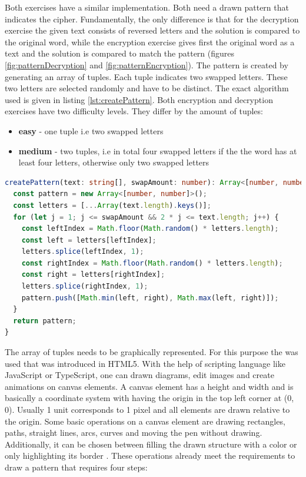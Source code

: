 Both exercises have a similar implementation. Both need a drawn pattern that indicates the cipher. Fundamentally, the only difference is that for the decryption exercise the given text consists of reversed letters and the solution is compared to the original word, while the encryption exercise gives first the original word as a text and the solution is compared to match the pattern (figures \ref{fig:patternDecryption} and \ref{fig:patternEncryption}). 
The pattern is created by generating an array of tuples. Each tuple indicates two swapped letters. These two letters are selected randomly and have to be distinct. The exact algorithm used is given in listing \ref{lst:createPattern}.
Both encryption and decryption exercises have two difficulty levels. They differ by the amount of tuples:

\begin{itemize}
    \item \textbf{easy} - one tuple i.e two swapped letters 
    \item \textbf{medium} - two tuples, i.e in total four swapped letters if the the word has at least four letters, otherwise only two swapped letters 
\end{itemize}

\begin{lstlisting}[language=TypeScript,caption={Algorithm to generate an array of distinct tuples of given size},label={lst:createPattern}]
createPattern(text: string[], swapAmount: number): Array<[number, number]> {
  const pattern = new Array<[number, number]>();
  const letters = [...Array(text.length).keys()];
  for (let j = 1; j <= swapAmount && 2 * j <= text.length; j++) {
    const leftIndex = Math.floor(Math.random() * letters.length);
    const left = letters[leftIndex];
    letters.splice(leftIndex, 1);
    const rightIndex = Math.floor(Math.random() * letters.length);
    const right = letters[rightIndex];
    letters.splice(rightIndex, 1);
    pattern.push([Math.min(left, right), Math.max(left, right)]);
  }
  return pattern;
}
\end{lstlisting}

The array of tuples needs to be graphically represented. For this purpose the  was used that was introduced in HTML5. With the help of scripting language like JavaScript or TypeScript, one can drawn diagrams, edit images and create animations on canvas elements. A canvas element has a height and width and is basically a coordinate system with having the origin in the top left corner at (0, 0). Usually 1 unit corresponds to 1 pixel and all elements are drawn relative to the origin. Some basic operations on a canvas element are drawing rectangles, paths, straight lines, arcs, curves and moving the pen without drawing. Additionally, it can be chosen between filling the drawn structure with a color or only highlighting its border \cite{MDNWebDocs}. These operations already meet the requirements to draw a pattern that requires four steps: 

